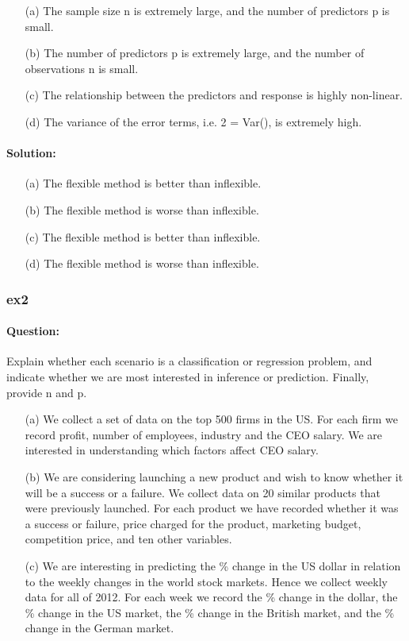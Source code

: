 \documentclass[a4paper,12pt,titlepage]{article} %
\begin{document}
\begin{itemize}
	\item[(a)] The sample size n is extremely large, and the number of predictors p is small.
	\item[(b)] The number of predictors p is extremely large, and the number of observations n is small.
	\item[(c)] The relationship between the predictors and response is highly non-linear.
	\item[(d)] The variance of the error terms, i.e. 2 = Var(), is extremely high.
\end{itemize}

\paragraph{Solution:}
\begin{itemize}
	\item[(a)] The flexible method is better than inflexible.
	\item[(b)] The flexible method is worse  than inflexible.
	\item[(c)] The flexible method is better  than inflexible.
	\item[(d)] The flexible method is worse  than inflexible.
\end{itemize}

\subsubsection{ex2}
\paragraph{Question:} Explain whether each scenario is a classification or regression problem, and indicate whether we are most interested in inference or prediction. Finally, provide n and p.

\begin{itemize}
	\item[(a)] We collect a set of data on the top 500 firms in the US. For each firm we record profit, number of employees, industry and the CEO salary. We are interested in understanding which factors affect CEO salary.		
	\item[(b)] We are considering launching a new product and wish to know whether it will be a success or a failure. We collect data on 20 similar products that were previously launched. For each product we have recorded whether it was a success or failure, price charged for the product, marketing budget, competition price, and ten other variables.	
	\item[(c)] We are interesting in predicting the \% change in the US dollar in relation to the weekly changes in the world stock markets. Hence we collect weekly data for all of 2012. For each week we record the \% change in the dollar, the \% change in the US market, the \% change in the British market, and the \% change in the German market.
\end{itemize}
\end{document}
